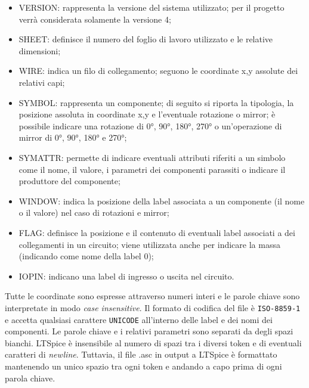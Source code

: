 \begin{itemize}
	\item VERSION: rappresenta la versione del sistema utilizzato; per il progetto verrà considerata solamente la versione 4;
	\item SHEET: definisce il numero del foglio di lavoro utilizzato e le relative dimensioni;
	\item WIRE: indica un filo di collegamento; seguono le coordinate x,y assolute dei relativi capi;
	\item SYMBOL: rappresenta un componente; di seguito si riporta la tipologia, la posizione assoluta in coordinate x,y e l'eventuale rotazione o mirror; è possibile indicare una rotazione di 0°, 90°, 180°, 270° o un'operazione di mirror di 0°, 90°, 180° e 270°;
	\item SYMATTR: permette di indicare eventuali attributi riferiti a un simbolo come il nome, il valore, i parametri dei componenti parassiti o indicare il produttore del componente;
	\item WINDOW: indica la posizione della label associata a un componente (il nome o il valore) nel caso di rotazioni e mirror;
	\item FLAG: definisce la posizione e il contenuto di eventuali label associati a dei collegamenti in un circuito; viene utilizzata anche per indicare la massa (indicando come nome della label 0);
	\item IOPIN: indicano una label di ingresso o uscita nel circuito. 
\end{itemize}
Tutte le coordinate sono espresse attraverso numeri interi e le parole chiave sono interpretate in modo \textit{case insensitive}. Il formato di codifica del file è \texttt{ISO-8859-1} e accetta qualsiasi carattere \texttt{UNICODE} all'interno delle label e dei nomi dei componenti. Le parole chiave e i relativi parametri sono separati da degli spazi bianchi. LTSpice è insensibile al numero di spazi tra i diversi token e di eventuali caratteri di \textit{newline}. Tuttavia, il file .asc in output a LTSpice è formattato mantenendo un unico spazio tra ogni token e andando a capo prima di ogni parola chiave.

